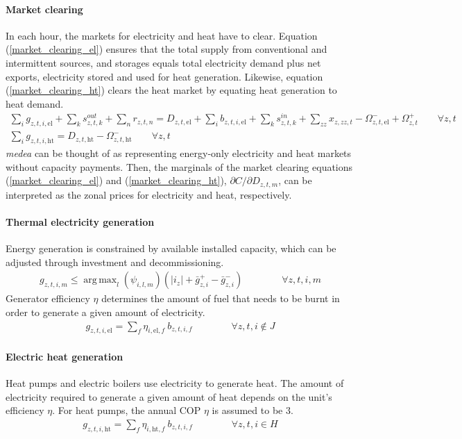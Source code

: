 \documentclass[11pt,a4paper]{article}
\DeclareMathOperator*{\argmax}{arg\,max}
\begin{document}
\paragraph{Market clearing}
In each hour, the markets for electricity and heat have to clear.
Equation (\ref{market_clearing_el}) ensures that the total supply from conventional and intermittent sources, and storages equals total electricity demand plus net exports, electricity stored and used for heat generation. 
Likewise, equation (\ref{market_clearing_ht}) clears the heat market by equating heat generation to heat demand.
\begin{align}
\sum_{i} g_{z,t,i,\text{el}} + \sum_{k} s^{out}_{z,t,k} + \sum_{n} r_{z,t,n} =
D_{z,t,\text{el}} + \sum_{i} b_{z,t,i,\text{el}} + \sum_{k} s^{in}_{z,t,k} + \sum_{zz} x_{z,zz,t} 
- \Omega^{-}_{z,t,\text{el}} + \Omega^{+}_{z,t} \qquad \forall z,t \label{market_clearing_el} \\
\sum_{i} g_{z,t,i,\text{ht}} = D_{z,t,\text{ht}} - \Omega^{-}_{z,t,\text{ht}} \qquad \forall z,t \label{market_clearing_ht}
\end{align}
\emph{medea} can be thought of as representing energy-only electricity and heat markets without capacity payments. Then, the marginals of the market clearing equations (\ref{market_clearing_el}) and (\ref{market_clearing_ht}), $\partial C / \partial D_{z,t,m}$, can be interpreted as the zonal prices for electricity and heat, respectively.

\paragraph{Thermal electricity generation}
Energy generation is constrained by available installed capacity, which can be adjusted through investment and decommissioning.
\begin{align}
g_{z,t,i,m} \leq \argmax_{l}(\psi_{i,l,m}) \left( |i_{z}| + \bar{g}^{+}_{z,i} - \bar{g}^{-}_{z,i} \right) \qquad \qquad \forall z,t,i,m
\end{align}
Generator efficiency $\eta$ determines the amount of fuel that needs to be burnt in order to generate a given amount of electricity.
\begin{align}
g_{z,t,i,\text{el}} = \sum_{f} \eta_{i,\text{el},f} \: b_{z,t,i,f} \qquad \qquad \forall z,t,i \notin J
\end{align}

\paragraph{Electric heat generation}
Heat pumps and electric boilers use electricity to generate heat. The amount of electricity required to generate a given amount of heat depends on the unit's efficiency $\eta$. For heat pumps, the annual COP $\eta$ is assumed to be $3$.
\begin{align}
g_{z,t,i,\text{ht}} = \sum_{f} \eta_{i,\text{ht},f} \: b_{z,t,i,f} \qquad \qquad \forall z,t,i \in H
\end{align}
\end{document}
